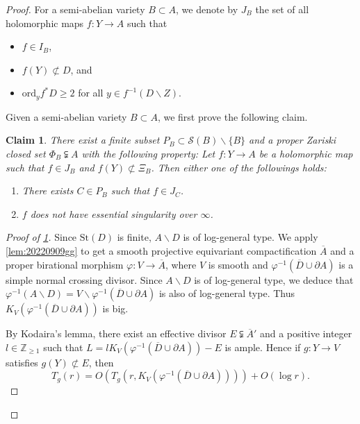 \documentclass[11pt,english]{smfart}
\theoremstyle{plain}
\newtheorem{claim}[thm]{Claim}
\theoremstyle{definition}
\theoremstyle{remark}
\numberwithin{equation}{section}
\theoremstyle{plain}
\begin{document}
	\begin{proof}
		For a semi-abelian variety $B\subset A$, we denote by $J_B$ the set of all holomorphic maps $f:Y\to A$ such that 
		\begin{itemize}
			\item
			$f\in I_B$,  
			\item
			$f(Y)\not\subset D$, and
			\item
			$\mathrm{ord}_yf^*D\geq 2$ for all $y\in f^{-1}(D\backslash Z)$. \end{itemize}
		Given a semi-abelian variety $B\subset A$, we first prove the following claim.
		
		\begin{claim}\label{claim:20230405}
			There exist a finite subset $P_B\subset \mathcal{S}(B)\backslash\{B\}$ and a proper Zariski closed set $\Phi_B\subsetneqq A$ with the following property:
			Let $f:Y\to A$ be a holomorphic map such that $f\in J_B$ and $f(Y)\not\subset \Xi_B$. 
			Then either one of the followings holds:
			\begin{enumerate}[label=(\alph*)]
				\item
				There exists $C\in P_B$ such that $f\in J_C$.
				\item
				$f$ does not have essential singularity over $\infty$.
			\end{enumerate}
		\end{claim}
		
		\begin{proof}[Proof of \cref{claim:20230405}]
			Since $\mathrm{St}(D)$ is finite, $A\backslash D$ is of log-general type.
			We apply \cref{lem:20220909gg} to get a smooth projective equivariant compactification $\overline{A}$ and a proper birational morphism $\varphi:V\to \overline{A}$, where $V$ is smooth and $\varphi^{-1}(\overline{D}\cup \partial A)$ is a simple normal crossing divisor.
			Since $A\backslash D$ is of log-general type, we deduce that $\varphi ^{-1}(A\backslash D)=V\backslash \varphi^{-1}(\overline{D}\cup \partial A)$ is also of log-general type.
			Thus $K_{V}(\varphi^{-1}(\overline{D}\cup \partial A))$ is big.
			
			By Kodaira's lemma, there exist an effective divisor $E\subsetneqq \overline{A}'$ and a positive integer $l\in\mathbb Z_{\geq 1}$ such that $L=lK_{V}(\varphi^{-1}(\overline{D}\cup \partial A))-E$ is ample.	
			Hence if $g:Y\to V$ satisfies $g(Y)\not\subset E$, then 
			$$T_{g}(r)= O( T_{g}(r,K_{V}(\varphi^{-1}(\overline{D}\cup \partial A))))+O(\log r).$$ 	
			

\end{proof}
\end{proof}
\end{document}
